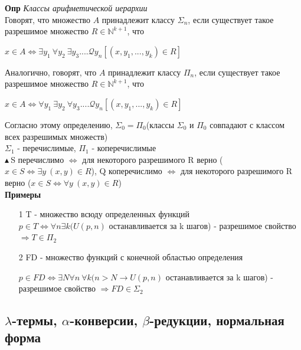 \textbf{Опр} \textit{Классы арифметической иерархии}\\
Говорят, что множество $A $ принадлежит классу $\Sigma_n$, если существует такое разрешимое множество $R \in \mathbb{N}^{k+1}$, что  \begin{center}
    $x \in A \Longleftrightarrow \exists y_1 \ \forall y_2 \ \exists y_3 .... \mathcal{Q} y_n [(x, y_1,...,y_k) \in R]$
\\
\end{center} 
Аналогично, говорят, что $A$ принадлежит классу $\Pi_n$, если существует такое разрешимое множество $R \in \mathbb{N}^{k+1}$, что \begin{center}
    $x \in A \Longleftrightarrow \forall y_1 \ \exists y_2 \ \forall y_3 .... \mathcal{Q} y_n [(x, y_1,...,y_k) \in R]$
\end{center} 
Согласно этому определению, $\Sigma_0 = \Pi_0$(классы $\Sigma_0$ и $\Pi_0$ совпадают с классом всех разрешимых множеств)
\\
$\Sigma_1$ - перечислимые, $\Pi_1$ - коперечислимые
\\
$\blacktriangle \ $S перечислимо $\Longleftrightarrow$ для некоторого разрешимого R верно ($x \in S \Longleftrightarrow \exists y \ (x,y) \in R$), Q коперечислимо $\Longleftrightarrow$ для некоторого разрешимого R верно ($x \in S \Longleftrightarrow \forall y \ (x,y) \in R$)\\
\textbf{Примеры}
\begin{itemize}
    \item[1] T - множество всюду определенных функций \\ $p \in T \Longleftrightarrow \forall n \exists k (U(p,n)$ останавливается за k шагов) - разрешимое свойство $\Longrightarrow T \in \Pi_2$
    \item[2] FD - множество функций с конечной областью определения
    
    $p \in FD \Leftrightarrow \exists N \forall n \ \forall k  (n > N \longrightarrow U(p,n)$ останавливается за k шагов) - разрешимое свойство $\Longrightarrow FD \in \Sigma_2$
\end{itemize}

\subsection{$\lambda$-термы, $\alpha$-конверсии, $\beta$-редукции, нормальная форма}

